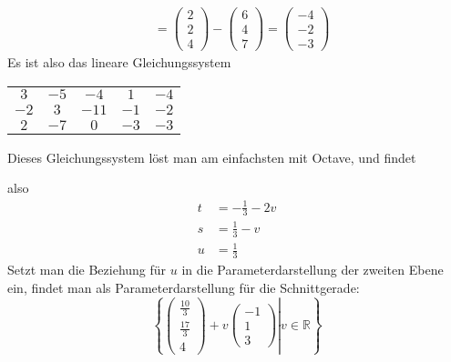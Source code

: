 \begin{loesung}
\begin{align*}
&=
\begin{pmatrix}2\\2\\4\end{pmatrix}
-
\begin{pmatrix}6\\4\\7\end{pmatrix}
=
\begin{pmatrix}-4\\-2\\-3\end{pmatrix}
\end{align*}
Es ist also das lineare Gleichungssystem
\begin{center}
\begin{tabular}{|cccc|c|}
\hline
$ 3$&$-5$&$ -4$&$ 1$&$-4$\\
$-2$&$ 3$&$-11$&$-1$&$-2$\\
$ 2$&$-7$&$  0$&$-3$&$-3$\\
\hline
\end{tabular}
\end{center}
Dieses Gleichungssystem löst man am einfachsten mit Octave, und findet

also
\begin{align*}
t&=-\frac13-2v\\
s&=\frac13-v\\
u&=\frac13
\end{align*}
Setzt man die Beziehung für $u$ in die Parameterdarstellung der
zweiten Ebene  ein, findet man als Parameterdarstellung für die
Schnittgerade:
\[
\left\{\left.
\begin{pmatrix}\frac{10}{3}\\\frac{17}{3}\\4\end{pmatrix}
+v
\begin{pmatrix}-1\\1\\3\end{pmatrix}
\right|
v\in\mathbb R
\right\}
\]

\end{loesung}

